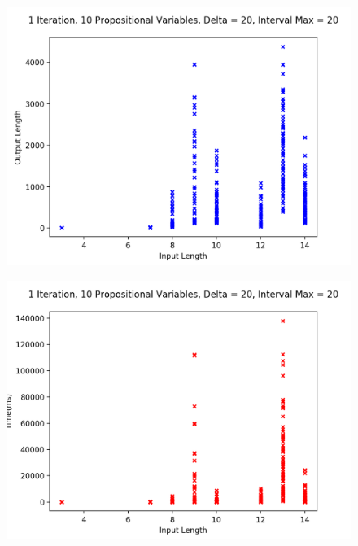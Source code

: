 \documentclass[runningheads]{llncs}
\begin{document}
\vspace{-4mm}
\begin{minipage}{0.5 \textwidth}
    \begin{figure}[H]
    \centering
    \includegraphics[scale=0.39]{images/Sim2Length.png}
    \end{figure}
\end{minipage}%
\begin{minipage}{0.5 \textwidth}
    \begin{figure}[H]
    \centering
    \includegraphics[scale=0.39]{images/Sim2Time.png}
    \end{figure}
\end{minipage}%
\end{document}
